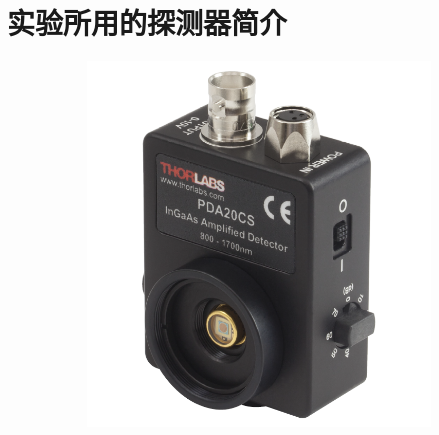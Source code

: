 \section{实验所用的探测器简介}


\begin{figure}[!htbp]
	\centering
	\begin{subfigure}[c]{0.5\textwidth}
		\includegraphics[width=\textwidth]{./Img/PDA20CS-EC-IMG.png}
		\caption{}
		\label{PDA20CS-EC-IMG}
	\end{subfigure}%
	~%
	\begin{subfigure}[c]{0.5\textwidth}

\end{subfigure}
\end{figure}
